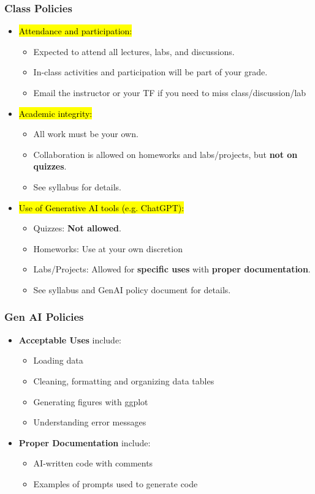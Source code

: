 \documentclass[slidestop,compress,mathserif]{beamer}
\begin{document}
\begin{frame}
	\frametitle{Class Policies} 
	\begin{itemize}
		\item \hl{Attendance and participation:} 
		\begin{itemize}
			\item Expected to attend all lectures, labs, and discussions. 
			\item In-class activities and participation will be part of your grade.
			\item Email the instructor or your TF if you need to miss class/discussion/lab
		\end{itemize}
		\item \hl{Academic integrity:} 
		\begin{itemize}
			\item All work must be your own. 
			\item Collaboration is allowed on homeworks and labs/projects, but \textbf{not on quizzes}. 
			\item See syllabus for details.
		\end{itemize}
		\item \hl{Use of Generative AI tools (e.g. ChatGPT):}
		\begin{itemize}
			\item Quizzes: \textbf{Not allowed}.
			\item Homeworks: Use at your own discretion
			\item Labs/Projects: Allowed for \textbf{specific uses} with \textbf{proper documentation}.
			\item See syllabus and GenAI policy document for details.
		\end{itemize}
	\end{itemize}
\end{frame}

\begin{frame}
	\frametitle{Gen AI Policies}
	\begin{itemize}
		\item \textbf{Acceptable Uses} include:
		\begin{itemize}	
			\item Loading data
			\item Cleaning, formatting and organizing data tables
			\item Generating figures with ggplot
			\item Understanding error messages
		\end{itemize}		
	\end{itemize} 
	\begin{itemize}
		\item \textbf{Proper Documentation} include:
		\begin{itemize}	
			\item AI-written code with comments
			\item Examples of prompts used to generate code
		\end{itemize}		
	\end{itemize}
\end{frame}
\end{document}
